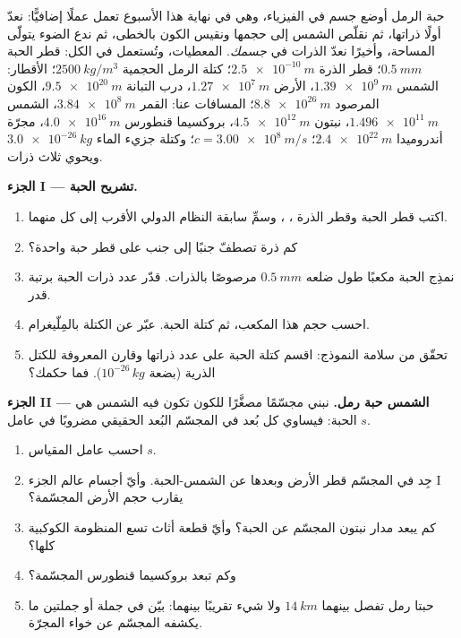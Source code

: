 \begin{problem}
\label{pb:g10:orders-of-magnitude:1}
حبة الرمل أوضع جسم في الفيزياء، وهي في نهاية هذا الأسبوع
تعمل عملًا إضافيًّا: نعدّ أولًا ذراتها، ثم نقلّص الشمس إلى
حجمها ونقيس الكون بالخطى، ثم ندع الضوء يتولّى المساحة،
وأخيرًا نعدّ الذرات في \emph{جسمك}. المعطيات، وتُستعمل في الكل:
قطر الحبة $\qty{0.5}{mm}$؛ قطر الذرة $\qty{2.5e-10}{m}$؛
كتلة الرمل الحجمية $\qty{2500}{kg/m^3}$؛ الأقطار: الشمس
$\qty{1.39e9}{m}$، الأرض $\qty{1.27e7}{m}$، درب التبانة
$\qty{9.5e20}{m}$، الكون المرصود $\qty{8.8e26}{m}$؛ المسافات
عنا: القمر $\qty{3.84e8}{m}$، الشمس $\qty{1.496e11}{m}$، نبتون
$\qty{4.5e12}{m}$، بروكسيما قنطورس $\qty{4.0e16}{m}$، مجرّة
أندروميدا $\qty{2.4e22}{m}$؛ $c = \qty{3.00e8}{m/s}$؛ وكتلة جزيء الماء
$\qty{3.0e-26}{kg}$ ويحوي ثلاث ذرات.

\medskip
\noindent\textbf{الجزء I --- تشريح الحبة.}
\begin{enumerate}
  \item اكتب قطر الحبة وقطر الذرة ، ، وسمِّ سابقة النظام الدولي الأقرب إلى كل
        منهما.
  \item كم ذرة تصطفّ جنبًا إلى جنب على قطر حبة واحدة؟
  \item نمذِج الحبة مكعبًا طول ضلعه $\qty{0.5}{mm}$ مرصوصًا
        بالذرات. قدّر عدد ذرات الحبة برتبة
        قدر.
  \item احسب حجم هذا المكعب، ثم كتلة الحبة.
        عبّر عن الكتلة بالمِلّيغرام.
  \item تحقّق من سلامة النموذج: اقسم كتلة الحبة على عدد
        ذراتها وقارن  المعروفة
        للكتل الذرية (بضعة $10^{-26}\,\unit{kg}$). فما حكمك؟
\end{enumerate}

\medskip
\noindent\textbf{الجزء II --- الشمس حبة رمل.}
نبني مجسّمًا مصغَّرًا للكون تكون فيه الشمس هي الحبة:
فيساوي كل بُعد في المجسّم البُعد الحقيقي مضروبًا في عامل $s$.
\begin{enumerate}[resume]
  \item احسب عامل المقياس $s$.
  \item جِد في المجسّم قطر الأرض وبعدها عن
        الشمس-الحبة. وأيّ أجسام عالم الجزء I يقارب
        حجم الأرض المجسّمة؟
  \item كم يبعد مدار نبتون المجسّم عن الحبة؟ وأيّ قطعة
        أثاث تسع المنظومة الكوكبية كلها؟
  \item وكم تبعد بروكسيما قنطورس المجسّمة؟
  \item حبتا رمل تفصل بينهما $\qty{14}{km}$ ولا شيء تقريبًا
        بينهما: بيّن في جملة أو جملتين ما يكشفه المجسّم
        عن خواء المجرّة.
\end{enumerate}


\end{problem}
